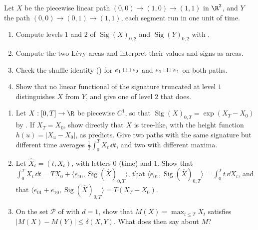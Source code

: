 \providecommand{\sigSig}{\operatorname{Sig}}
\providecommand{\sigsh}{\mathbin{\sqcup\mkern-3mu\sqcup}}
\providecommand{\sigX}{\mathbb X}

\begin{exercise}\label{ex:sig-two-corners}
\easy Let $X$ be the piecewise linear path $(0,0)\to(1,0)\to(1,1)$ in $\R^2$, and $Y$ the path
$(0,0)\to(0,1)\to(1,1)$, each segment run in one unit of time.
\begin{enumerate}[label=(\alph*)]
  \item Compute levels $1$ and $2$ of $\sigSig(X)_{0,2}$ and $\sigSig(Y)_{0,2}$ with .
  \item Compute the two L\'evy areas and interpret their values and signs as areas.
  \item Check the shuffle identity () for $e_1\sigsh e_2$ and $e_1\sigsh e_1$ on both paths.
  \item Show that no linear functional of the signature truncated at level $1$ distinguishes $X$ from $Y$, and
    give one of level $2$ that does.
\end{enumerate}
\end{exercise}

\begin{exercise}\label{ex:sig-one-dimension}
\easy
\begin{enumerate}[label=(\alph*)]
  \item Let $X:[0,T]\to\R$ be piecewise $C^1$, so that $\sigSig(X)_{0,T}=\exp(X_T-X_0)$ by .
    If $X_T=X_0$, show directly that $X$ is tree-like, with the height function $h(u)=|X_u-X_0|$, as
     predicts. Give two paths with the same signature but different time averages
    $\frac1T\int_0^TX_t\,\dd t$, and two with different maxima.
  \item Let $\widehat X_t=(t,X_t)$, with letters $0$ (time) and $1$. Show that
    $\int_0^TX_t\,\dd t=TX_0+\langle e_{10},\sigSig(\widehat X)_{0,T}\rangle$, that
    $\langle e_{01},\sigSig(\widehat X)_{0,T}\rangle=\int_0^Tt\,\dd X_t$, and that
    $\langle e_{01}+e_{10},\sigSig(\widehat X)_{0,T}\rangle=T(X_T-X_0)$.
  \item On the set $\mathcal P$ of  with $d=1$, show that
    $M(X)=\max_{t\le T}X_t$ satisfies $|M(X)-M(Y)|\le\delta(X,Y)$. What does  then say
    about $M$?
\end{enumerate}
\end{exercise}

